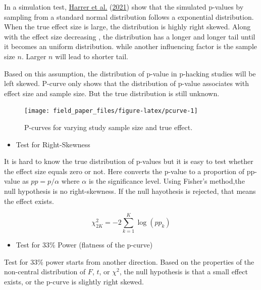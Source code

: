\documentclass[
  11pt,
  openany]{memoir}
\providecommand{\tightlist}{%
  \setlength{\itemsep}{0pt}\setlength{\parskip}{0pt}}
\begin{document}
In a simulation test, \protect\hyperlink{ref-harrer2021doing}{Harrer et al.} (\protect\hyperlink{ref-harrer2021doing}{2021}) show that the simulated p-values by sampling from a standard normal distribution follows a exponential distribution. When the true effect size is large, the distribution is highly right skewed. Along with the effect size decreasing , the distribution has a longer and longer tail until it becomes an uniform distribution. while another influencing factor is the sample size \(n\). Larger \(n\) will lead to shorter tail.

Based on this assumption, the distribution of p-value in p-hacking studies will be left skewed.
P-curve only shows that the distribution of p-value associates with effect size and sample size.
But the true distribution is still unknown.

\begin{figure}

{\centering \texttt{[image: field\_paper\_files/figure-latex/pcurve-1]} 

}

\caption{P-curves for varying study sample size and true effect.}\label{fig:pcurve}
\end{figure}

\begin{itemize}
\tightlist
\item
  Test for Right-Skewness
\end{itemize}

It is hard to know the true distribution of p-values but it is easy to test whether the effect size equals zero or not.
Here converts the p-value to a proportion of pp-value as \(pp=p/\alpha\) where \(\alpha\) is the significance level.
Using Fisher's method,the null hypothesis is no right-skewness. If the null hayothesis is rejected, that means the effect exists.

\begin{equation}
\chi^2_{2K} = -2 \sum^K_{k=1} \log(pp_k)
\end{equation}

\begin{itemize}
\tightlist
\item
  Test for 33\% Power (flatness of the p-curve)
\end{itemize}

Test for 33\% power starts from another direction. Based on the properties of the non-central distribution of \(F\), \(t\), or \(\chi^2\), the null hypothesis is that a small effect exists, or the p-curve is slightly right skewed.
\end{document}
